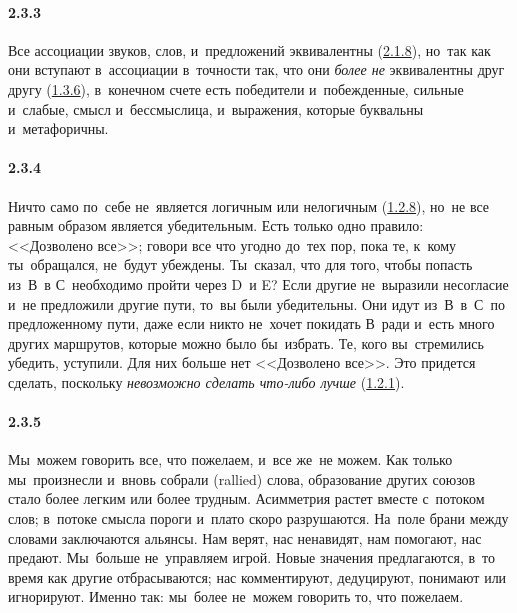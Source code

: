 \paragraph{2.3.3}\hypertarget{par:2.3.3}{} Все ассоциации звуков, слов, и~предложений эквивалентны (\hyperlink{par:2.1.8}{2.1.8}), но~так как они вступают в~ассоциации в~точности так, что они {\itshape более не} эквивалентны друг другу (\hyperlink{par:1.3.6}{1.3.6}), в~конечном счете есть победители и~побежденные, сильные и~слабые, смысл и~бессмыслица, и~выражения, которые буквальны и~метафоричны.

\paragraph{2.3.4}\hypertarget{par:2.3.4}{} Ничто само по~себе не~является логичным или нелогичным (\hyperlink{par:1.2.8}{1.2.8}), но~не все равным образом является убедительным. Есть только одно правило: <<Дозволено все>>; говори все что угодно до~тех пор, пока те, к~кому ты~обращался, не~будут убеждены. Ты~сказал, что для того, чтобы попасть из~В~в С~необходимо пройти через D~и E? Если другие не~выразили несогласие и~не предложили другие пути, то~вы были убедительны. Они идут из~В~в~С~по предложенному пути, даже если никто не~хочет покидать В~ради и~есть много других маршрутов, которые можно было бы~избрать. Те, кого вы~стремились убедить, уступили. Для них больше нет <<Дозволено все>>. Это придется сделать, поскольку {\itshape невозможно сделать что-либо лучше} (\hyperlink{par:1.2.1}{1.2.1}).

\paragraph{2.3.5}\hypertarget{par:2.3.5}{} Мы~можем говорить все, что пожелаем, и~все же~не можем. Как только мы~произнесли и~вновь собрали (rallied) слова, образование других союзов стало более легким или более трудным. Асимметрия растет вместе с~потоком слов; в~потоке смысла пороги и~плато скоро разрушаются. На~поле брани между словами заключаются альянсы. Нам верят, нас ненавидят, нам помогают, нас предают. Мы~больше не~управляем игрой. Новые значения предлагаются, в~то время как другие отбрасываются; нас комментируют, дедуцируют, понимают или игнорируют. Именно так: мы~более не~можем говорить то, что пожелаем.

